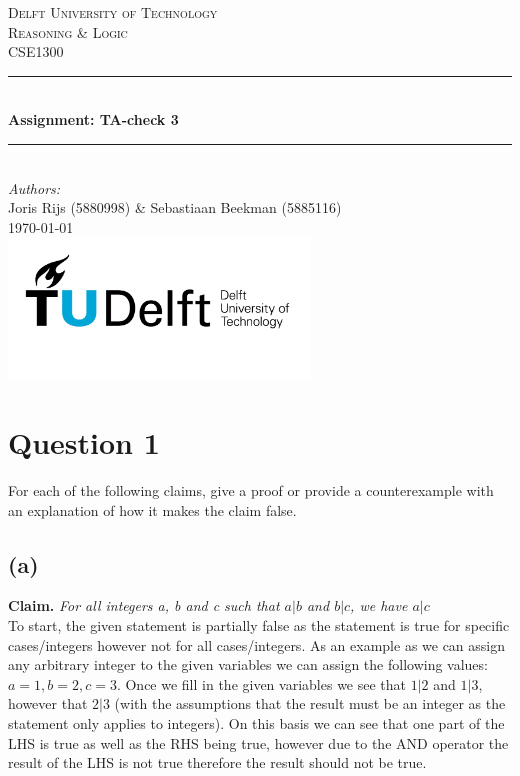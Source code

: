 \documentclass[a4paper]{article}
\begin{document}
\begin{titlepage}
    \newcommand{\HRule}{\rule{\linewidth}{0.5mm}}
    \center

    \textsc{\LARGE Delft University of Technology}\\[1cm]

    \textsc{\Large Reasoning \& Logic}\\[0.2cm]
    \textsc{\large CSE1300}\\[1cm]
    \HRule \\[0.8cm]
    { \huge \bfseries Assignment: TA-check 3}\\[0.7cm]
    \HRule \\[2cm]
    \large
    \emph{Authors:}\\
    Joris Rijs (5880998) \& Sebastiaan Beekman (5885116)\\[1.5cm]
    {\large \today}\\[5cm]
    \includegraphics[width=0.6\textwidth]{images/TU_delft_logo.jpg}\\[1cm]
    \vfill
\end{titlepage}

\newpage
\tableofcontents

\newpage
\section{Question 1}
For each of the following claims, give a proof or provide a counterexample with an explanation of how it makes the claim false. \\
\subsection{(a)} 
\textbf{Claim.} \textit{For all integers a, b and c such that $a | b$ and $b | c$, we have $a | c$} \\
To start, the given statement is partially false as the statement is true for specific cases/integers however not for all cases/integers.
As an example as we can assign any arbitrary integer to the given variables we can assign the following values: $a = 1, b = 2, c = 3$.
Once we fill in the given variables we see that $1 | 2 $ and $ 1 | 3$, however that $2 | 3$ (with the assumptions that the result must be an integer as the statement only applies to integers).
On this basis we can see that one part of the LHS is true as well as the RHS being true, however due to the AND operator the result of the LHS is not true therefore the result should not be true. 
\end{document}
